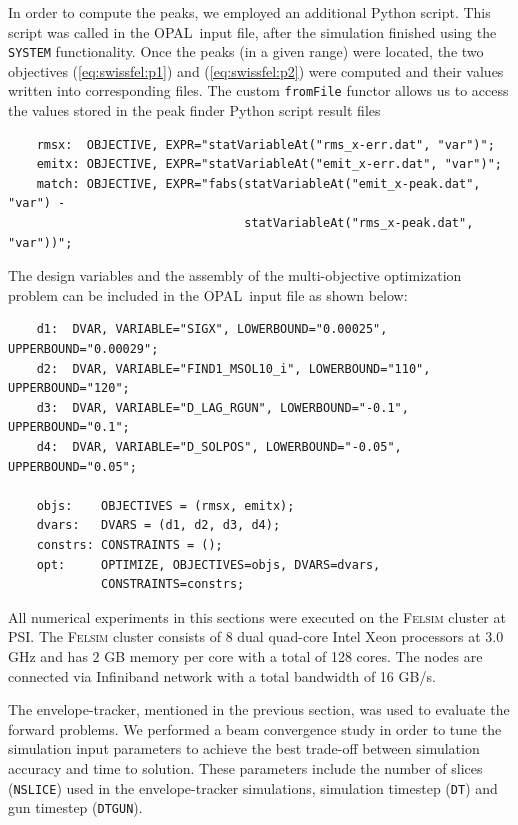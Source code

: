 In order to compute the peaks, we employed an additional Python script.
This script was called in the \textsc{OPAL}~input file, after the simulation
  finished using the \texttt{SYSTEM} functionality.
Once the peaks (in a given range) were located, the two objectives
  (\ref{eq:swissfel:p1}) and (\ref{eq:swissfel:p2}) were computed and their
  values written into corresponding files.
The custom \texttt{fromFile} functor allows us to access the values stored in
  the peak finder Python script result files

\vspace{0.2cm}
{\footnotesize \begin{verbatim}
    rmsx:  OBJECTIVE, EXPR="statVariableAt("rms_x-err.dat", "var")";
    emitx: OBJECTIVE, EXPR="statVariableAt("emit_x-err.dat", "var")";
    match: OBJECTIVE, EXPR="fabs(statVariableAt("emit_x-peak.dat", "var") -
                                 statVariableAt("rms_x-peak.dat", "var"))";
\end{verbatim}}
\vspace{0.2cm}

\noindent
The design variables and the assembly of the multi-objective optimization problem
  can be included in the \textsc{OPAL}~input file as shown below:

\vspace{0.2cm}
{\footnotesize \begin{verbatim}
    d1:  DVAR, VARIABLE="SIGX", LOWERBOUND="0.00025", UPPERBOUND="0.00029";
    d2:  DVAR, VARIABLE="FIND1_MSOL10_i", LOWERBOUND="110", UPPERBOUND="120";
    d3:  DVAR, VARIABLE="D_LAG_RGUN", LOWERBOUND="-0.1", UPPERBOUND="0.1";
    d4:  DVAR, VARIABLE="D_SOLPOS", LOWERBOUND="-0.05", UPPERBOUND="0.05";

    objs:    OBJECTIVES = (rmsx, emitx);
    dvars:   DVARS = (d1, d2, d3, d4);
    constrs: CONSTRAINTS = ();
    opt:     OPTIMIZE, OBJECTIVES=objs, DVARS=dvars,
             CONSTRAINTS=constrs;
\end{verbatim}}
\vspace{0.2cm}

All numerical experiments in this sections were executed on the
  \textsc{Felsim} cluster at PSI\@.
The \textsc{Felsim} cluster consists of 8 dual quad-core Intel Xeon
  processors at 3.0 GHz and has $2$ GB memory per core with a total of 128
  cores.
The nodes are connected via Infiniband network with a total bandwidth of 16
  GB/s.

The envelope-tracker, mentioned in the previous section, was used to evaluate
  the forward problems.
We performed a beam convergence study in order to tune the simulation input
  parameters to achieve the best trade-off between simulation accuracy and
  time to solution.
These parameters include the number of slices (\texttt{NSLICE}) used in the
  envelope-tracker simulations, simulation timestep (\texttt{DT}) and gun
  timestep (\texttt{DTGUN}).

